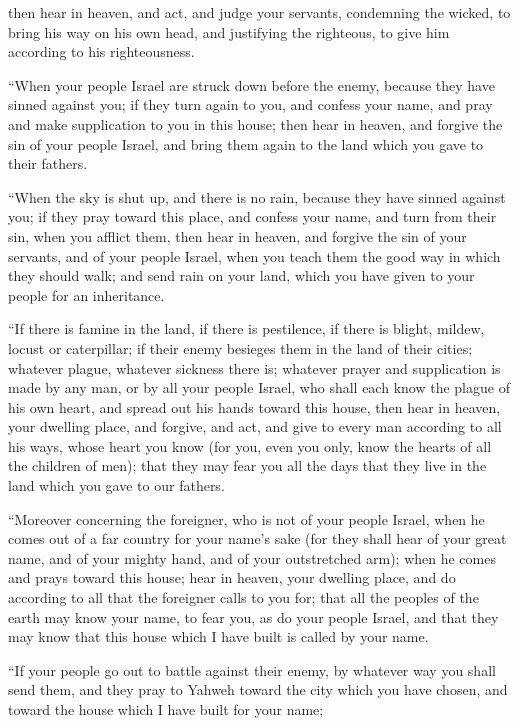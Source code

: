 {then hear in heaven, and act, and judge your servants, condemning the wicked, to bring his way on his own head, and justifying the righteous, to give him according to his righteousness.
\par }{\PP {}“When your people Israel are struck down before the enemy, because they have sinned against you; if they turn again to you, and confess your name, and pray and make supplication to you in this house;
then hear in heaven, and forgive the sin of your people Israel, and bring them again to the land which you gave to their fathers.
\par }{\PP {}“When the sky is shut up, and there is no rain, because they have sinned against you; if they pray toward this place, and confess your name, and turn from their sin, when you afflict them,
then hear in heaven, and forgive the sin of your servants, and of your people Israel, when you teach them the good way in which they should walk; and send rain on your land, which you have given to your people for an inheritance.
\par }{\PP {}“If there is famine in the land, if there is pestilence, if there is blight, mildew, locust or caterpillar; if their enemy besieges them in the land of their cities; whatever plague, whatever sickness there is;
whatever prayer and supplication is made by any man, or by all your people Israel, who shall each know the plague of his own heart, and spread out his hands toward this house,
then hear in heaven, your dwelling place, and forgive, and act, and give to every man according to all his ways, whose heart you know (for you, even you only, know the hearts of all the children of men);
that they may fear you all the days that they live in the land which you gave to our fathers.
\par }{\PP {}“Moreover concerning the foreigner, who is not of your people Israel, when he comes out of a far country for your name’s sake
(for they shall hear of your great name, and of your mighty hand, and of your outstretched arm); when he comes and prays toward this house;
hear in heaven, your dwelling place, and do according to all that the foreigner calls to you for; that all the peoples of the earth may know your name, to fear you, as do your people Israel, and that they may know that this house which I have built is called by your name.
\par }{\PP {}“If your people go out to battle against their enemy, by whatever way you shall send them, and they pray to Yahweh toward the city which you have chosen, and toward the house which I have built for your name;
}
